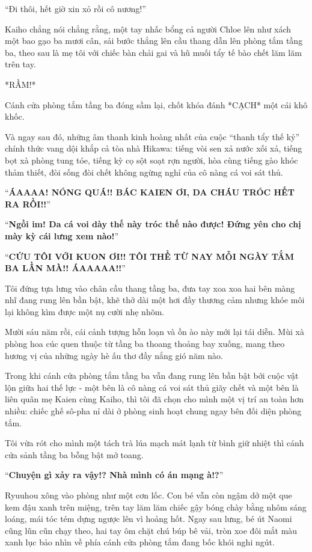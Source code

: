 \documentclass[../main.tex]{subfiles}
\begin{document}
``Đi thôi, hết giờ xin xỏ rồi cô nương!''

Kaiho chẳng nói chẳng rằng, một tay nhấc bổng cả người Chloe lên như xách một bao gạo ba mươi cân, sải bước thẳng lên cầu thang dẫn lên phòng tắm tầng ba, theo sau là mẹ tôi với chiếc bàn chải gai và hũ muối tẩy tế bào chết lăm lăm trên tay.

*RẦM!*

Cánh cửa phòng tắm tầng ba đóng sầm lại, chốt khóa đánh *CẠCH* một cái khô khốc.

Và ngay sau đó, những âm thanh kinh hoàng nhất của cuộc ``thanh tẩy thế kỷ'' chính thức vang dội khắp cả tòa nhà Hikawa: tiếng vòi sen xả nước xối xả, tiếng bọt xà phòng tung tóe, tiếng kỳ cọ sột soạt rợn người, hòa cùng tiếng gào khóc thảm thiết, đòi sống đòi chết không ngừng nghỉ của cô nàng cá voi sát thủ.

``\textbf{ÁAAAA! NÓNG QUÁ!! BÁC KAIEN ƠI, DA CHÁU TRÓC HẾT RA RỒI!!}''

``\textbf{Ngồi im! Da cá voi dày thế này tróc thế nào được! Đứng yên cho chị mày kỳ cái lưng xem nào!}''

``\textbf{CỨU TÔI VỚI KUON ƠI!! TÔI THỀ TỪ NAY MỖI NGÀY TẮM BA LẦN MÀ!! ÁAAAAA!!}''

Tôi đứng tựa lưng vào chân cầu thang tầng ba, đưa tay xoa xoa hai bên màng nhĩ đang rung lên bần bật, khẽ thở dài một hơi đầy thương cảm nhưng khóe môi lại không kìm được một nụ cười nhẹ nhõm.

Mười sáu năm rồi, cái cảnh tượng hỗn loạn và ồn ào này mới lại tái diễn. Mùi xà phòng hoa cúc quen thuộc từ tầng ba thoang thoảng bay xuống, mang theo hương vị của những ngày hè ấu thơ đầy nắng gió năm nào.


Trong khi cánh cửa phòng tắm tầng ba vẫn đang rung lên bần bật bởi cuộc vật lộn giữa hai thế lực - một bên là cô nàng cá voi sát thủ giãy chết và một bên là liên quân mẹ Kaien cùng Kaiho, thì tôi đã chọn cho mình một vị trí an toàn hơn nhiều: chiếc ghế sô-pha nỉ dài ở phòng sinh hoạt chung ngay bên đối diện phòng tắm.

Tôi vừa rót cho mình một tách trà lúa mạch mát lạnh từ bình giữ nhiệt thì cánh cửa sảnh tầng ba bỗng bật mở toang.

``\textbf{Chuyện gì xảy ra vậy!? Nhà mình có án mạng à!?}''

Ryuuhou xông vào phòng như một cơn lốc. Con bé vẫn còn ngậm dở một que kem đậu xanh trên miệng, trên tay lăm lăm chiếc gậy bóng chày bằng nhôm sáng loáng, mái tóc tém dựng ngược lên vì hoảng hốt. Ngay sau lưng, bé út Naomi cũng lũn cũn chạy theo, hai tay ôm chặt chú búp bê vải, tròn xoe đôi mắt màu xanh lục bảo nhìn về phía cánh cửa phòng tắm đang bốc khói nghi ngút.
\end{document}
